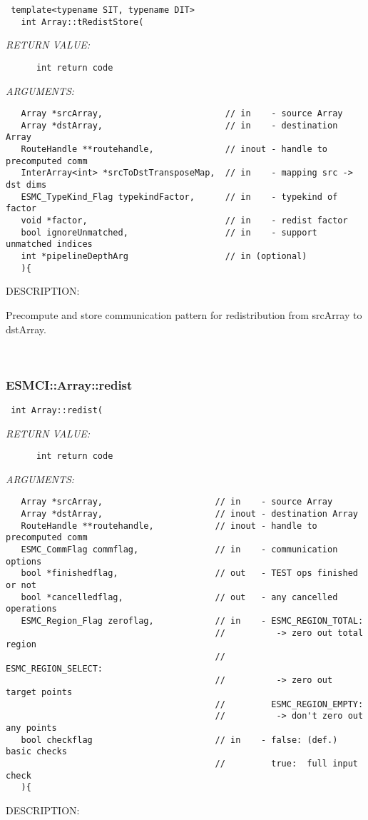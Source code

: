   
\begin{verbatim} template<typename SIT, typename DIT>
   int Array::tRedistStore(\end{verbatim}{\em RETURN VALUE:}
\begin{verbatim}      int return code\end{verbatim}{\em ARGUMENTS:}
\begin{verbatim}   Array *srcArray,                        // in    - source Array
   Array *dstArray,                        // in    - destination Array
   RouteHandle **routehandle,              // inout - handle to precomputed comm
   InterArray<int> *srcToDstTransposeMap,  // in    - mapping src -> dst dims
   ESMC_TypeKind_Flag typekindFactor,      // in    - typekind of factor
   void *factor,                           // in    - redist factor
   bool ignoreUnmatched,                   // in    - support unmatched indices
   int *pipelineDepthArg                   // in (optional)
   ){\end{verbatim}
{\sf DESCRIPTION:\\ }


    Precompute and store communication pattern for redistribution
    from srcArray to dstArray.
   
 
\mbox{}\hrulefill\
 
\subsubsection [ESMCI::Array::redist] {ESMCI::Array::redist}


  
\begin{verbatim} int Array::redist(\end{verbatim}{\em RETURN VALUE:}
\begin{verbatim}      int return code\end{verbatim}{\em ARGUMENTS:}
\begin{verbatim}   Array *srcArray,                      // in    - source Array
   Array *dstArray,                      // inout - destination Array
   RouteHandle **routehandle,            // inout - handle to precomputed comm
   ESMC_CommFlag commflag,               // in    - communication options
   bool *finishedflag,                   // out   - TEST ops finished or not
   bool *cancelledflag,                  // out   - any cancelled operations
   ESMC_Region_Flag zeroflag,            // in    - ESMC_REGION_TOTAL:
                                         //          -> zero out total region
                                         //         ESMC_REGION_SELECT:
                                         //          -> zero out target points
                                         //         ESMC_REGION_EMPTY:
                                         //          -> don't zero out any points
   bool checkflag                        // in    - false: (def.) basic checks
                                         //         true:  full input check
   ){\end{verbatim}
{\sf DESCRIPTION:\\ }


